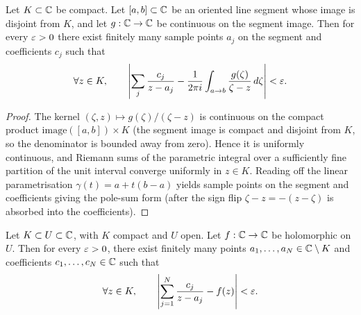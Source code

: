 \begin{lemma}
    \label{lem:segment_pole_sum_uniform_approx}
    Let \(K \subset \mathbb{C}\) be compact. Let \([a, b] \subset \mathbb{C}\) be an oriented
    line segment whose image is disjoint from \(K\), and let \(g : \mathbb{C} \to \mathbb{C}\)
    be continuous on the segment image. Then for every \(\varepsilon > 0\) there exist
    finitely many sample points \(a_j\) on the segment and coefficients \(c_j\)
    such that
    \[
      \forall z \in K,\qquad
      \left|
        \sum_{j} \frac{c_j}{z - a_j}
        -
        \frac{1}{2\pi i}\int_{a \to b} \frac{g(\zeta)}{\zeta - z}\,d\zeta
      \right| < \varepsilon .
    \]
\end{lemma}

\begin{proof}
    The kernel \((\zeta, z) \mapsto g(\zeta)/(\zeta - z)\) is continuous on the
    compact product \(\mathrm{image}([a,b]) \times K\) (the segment image is
    compact and disjoint from \(K\), so the denominator is bounded away from
    zero). Hence it is uniformly continuous, and Riemann sums of the parametric
    integral over a sufficiently fine partition of the unit interval converge
    uniformly in \(z \in K\). Reading off the linear parametrisation
    \(\gamma(t) = a + t(b - a)\) yields sample points on the segment and
    coefficients giving the pole-sum form (after the sign flip
    \(\zeta - z = -(z - \zeta)\) is absorbed into the coefficients).
\end{proof}

\begin{lemma}
    \label{lem:cauchy_integral_to_pole_sum}
    Let \(K \subset U \subset \mathbb{C}\), with \(K\) compact and \(U\) open. Let
    \(f : \mathbb{C} \to \mathbb{C}\) be holomorphic on \(U\). Then for every \(\varepsilon > 0\), there
    exist finitely many points \(a_1,\dots,a_N \in \mathbb{C} \setminus K\) and coefficients
    \(c_1,\dots,c_N \in \mathbb{C}\) such that
    \[
      \forall z \in K,\qquad
      \left|
        \sum_{j=1}^N \frac{c_j}{z-a_j} - f(z)
      \right| < \varepsilon .
    \]
\end{lemma}

